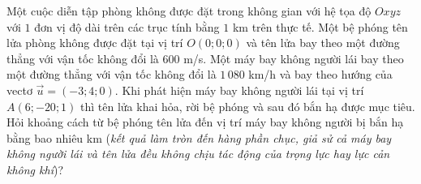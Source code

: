 \begin{ex}%
	Một cuộc diễn tập phòng không được đặt trong không gian với hệ tọa độ $Oxyz$ với $1$ đơn vị độ dài trên các trục tính bằng $1$ km trên thực tế. Một bệ phóng tên lửa phòng không được đặt tại vị trí $O(0;0;0)$ và tên lửa bay theo một đường thẳng với vận tốc không đổi là $600$ m/s. Một máy bay không người lái bay theo một đường thẳng với vận tốc không đổi là $1\,080$ km/h và bay theo hướng của vectơ $\overrightarrow{u}=(-3;4;0)$. Khi phát hiện máy bay không người lái tại vị trí $A(6;-20;1)$ thì tên lửa khai hỏa, rời bệ phóng và sau đó bắn hạ được mục tiêu. Hỏi khoảng cách từ bệ phóng tên lửa đến vị trí máy bay không người bị bắn hạ bằng bao nhiêu km (\textit{kết quả làm tròn đến hàng phần chục, giả sử cả máy bay không người lái và tên lửa đều không chịu tác động của trọng lực hay lực cản không khí})?
\end{ex}

